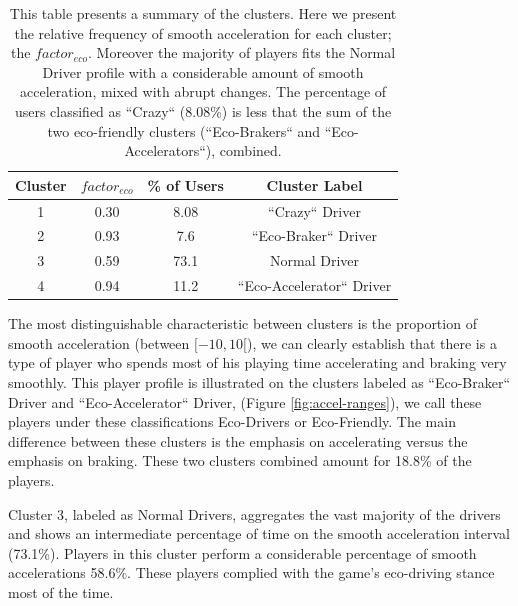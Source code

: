 \documentclass[preprint,authoryear,12pt]{elsarticle}
\begin{document}
\begin{table}[!h]
	\renewcommand*{\arraystretch}{1.4}
	\caption{This table presents a summary of the clusters. Here we present the relative frequency of smooth acceleration for each cluster; the $factor_{eco}$. Moreover the majority of players fits the Normal Driver profile with a considerable amount of smooth acceleration, mixed with abrupt changes. The percentage of users classified as ``Crazy`` (8.08\%) is less that the sum of the two eco-friendly clusters (``Eco-Brakers`` and ``Eco-Accelerators``), combined. }
	\begin{center}
		\begin{tabular}{c|c|c|c}
			Cluster & $factor_{eco}$ & \% of Users & Cluster Label \\
			\hline
			1 &	 0.30
			& 8.08  & ``Crazy`` Driver  \\
			
			2 & 0.93
			& 7.6  &  ``Eco-Braker`` Driver \\
			
			3 &	 0.59
			& 73.1  &  Normal Driver  \\
			
			4 & 0.94
			& 11.2  &  ``Eco-Accelerator`` Driver \\
		\end{tabular}
	\end{center}
	\label{T:factors}
\end{table}



The most distinguishable characteristic between clusters is the proportion of smooth acceleration (between $[-10, 10[$), we can clearly establish that there is a type of player who spends most of his playing time accelerating and braking very smoothly. This player profile is illustrated on the clusters labeled as ``Eco-Braker`` Driver and  ``Eco-Accelerator`` Driver, (Figure \ref{fig:accel-ranges}), we call these players under these classifications Eco-Drivers or Eco-Friendly. The main difference between these clusters is the emphasis on accelerating versus the emphasis on braking. These two clusters combined amount for 18.8\% of the players.



Cluster 3, labeled as Normal Drivers, aggregates the vast majority of the drivers and shows an intermediate percentage of time on the smooth acceleration interval (73.1\%). Players in this cluster perform a considerable percentage of smooth accelerations 58.6\%. These players complied with the game's eco-driving stance most of the time.
\end{document}
